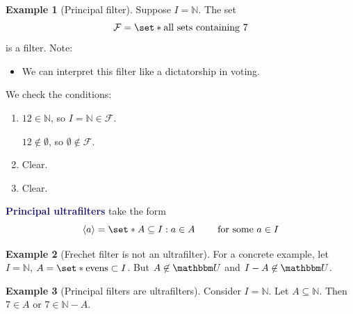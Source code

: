 \documentclass[11pt]{article}
\numberwithin{equation}{section}
\newcommand{\navy}[1]{\textcolor{MidnightBlue}{\bf #1}}
\newcounter{theo}[section]\setcounter{theo}{0}
\theoremstyle{definition}
\theoremstyle{definition}
\newtheorem{example}{\color{WildStrawberry}Example}[section]
\newcommand\angles[1]{\left\langle #1 \right\rangle}
\def\Set{\set*}%
\def\ss{\subset}
\def\sse{\subseteq}
\newcommand{\1}{\mathbbm 1}
\newcommand{\NN}{\mathbb N}
\newcommand{\UU}{\mathbbm U}
\newcommand{\fF}{\mathcal F}
\begin{document}
\begin{example}[Principal filter]
	Suppose $I = \NN$. The set
	\begin{equation}
		\fF = \Set{\text{all sets containing } 7}
	\end{equation}
	is a filter. Note:
	\begin{itemize}
		\item We can interpret this filter like a dictatorship in voting.
	\end{itemize}
	We check the conditions:
	\begin{enumerate}
		\item $12 \in \NN$, so $I = \NN \in \fF$.

		$12 \not\in \emptyset$, so $\emptyset \not\in\fF$. 
		\item Clear.
		\item Clear. 
	\end{enumerate}
\end{example}

\begin{definition}
	\navy{Principal ultrafilters} take the form
	\begin{equation}
		\angles{a} = \Set{A \sse I: a \in A} \qquad \text{ for some } a \in I
	\end{equation}
\end{definition}


\begin{example}[Frechet filter is not an ultrafilter]
	For a concrete example, let $I = \NN$, $A = \Set{\text{evens}} \ss I$. But $A \not\in \UU$ and $I-A\not\in\UU$.  
\end{example}

\begin{example}[Principal filters are ultrafilters]
	Consider $I = \NN$. Let $A \sse \NN$. Then $7 \in A$ or $7 \in \NN - A$. 
\end{example}
\end{document}
